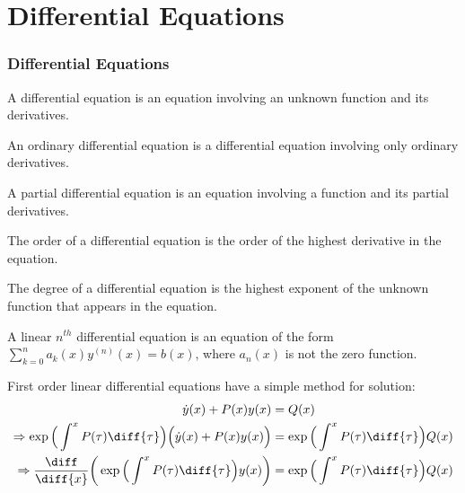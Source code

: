 \chapter{Differential Equations}
    \subsection{Differential Equations}
        \begin{definition}
            A differential equation is an equation involving an unknown
            function and its derivatives.
        \end{definition}
        \begin{definition}
            An ordinary differential equation is a differential
            equation involving only ordinary derivatives.
        \end{definition}
        \begin{definition}
            A partial differential equation is an equation involving
            a function and its partial derivatives.
        \end{definition}
        \begin{definition}
            The order of a differential equation is the order
            of the highest derivative in the equation.
        \end{definition}
        \begin{definition}
            The degree of a differential equation is the highest exponent
            of the unknown function that appears in the equation.
        \end{definition}
        \begin{definition}
            A linear $n^{th}$ differential equation is an equation of the
            form $\sum_{k=0}^{n}a_{k}(x)y^{(n)}(x)=b(x)$, where
            $a_{n}(x)$ is not the zero function.
        \end{definition}
        First order linear differential equations have a
        simple method for solution:
        \begin{subequations}
            \begin{align}
                \dot{y}(x)+P(x)y(x)&=Q(x)\\
                \Rightarrow
                \exp\Big(\int^{x}P(\tau)\diff{\tau}\Big)
                \Big(\dot{y}(x)+P(x)y(x)\Big)
                &=\exp\Big(\int^{x}P(\tau)\diff{\tau}\Big)Q(x)\\
                \Rightarrow
                \frac{\diff}{\diff{x}}\bigg(
                    \exp\Big(\int^{x}P(\tau)\diff{\tau}\Big)
                    y(x)\bigg)
                &=\exp\Big(\int^{x}P(\tau)\diff{\tau}\Big)Q(x)
            \end{align}
        \end{subequations}
